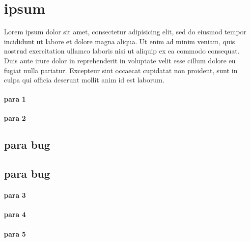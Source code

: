 \section{ipsum}


Lorem ipsum dolor sit amet, consectetur adipisicing elit, sed do eiusmod
tempor incididunt ut labore et dolore magna aliqua. Ut enim ad minim veniam,
quis nostrud exercitation ullamco laboris nisi ut aliquip ex ea commodo
consequat. Duis aute irure dolor in reprehenderit in voluptate velit esse
cillum dolore eu fugiat nulla pariatur. Excepteur sint occaecat cupidatat non
proident, sunt in culpa qui officia deserunt mollit anim id est laborum.

\paragraph{para 1}
\paragraph{para 2}

\subsection{para bug}

\subsection{para bug}

\paragraph{para 3}
\paragraph{para 4}
\paragraph{para 5}

